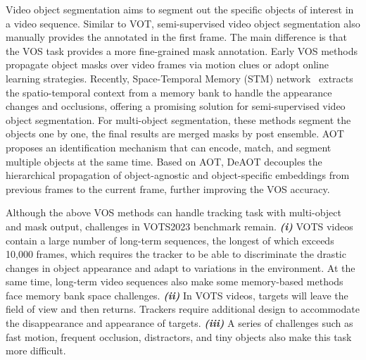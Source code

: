 \documentclass[10pt,twocolumn,letterpaper]{article}
\begin{document}
Video object segmentation aims to segment out the specific objects of interest in a video sequence. Similar to VOT, semi-supervised video object segmentation also manually provides the annotated in the first frame. The main difference is that the VOS task provides a more fine-grained mask annotation. 
Early VOS methods propagate object masks over video frames via motion clues\cite{segflow,tsai2016video} or adopt online learning strategies\cite{caelles2017one,li2018video}.
Recently, Space-Temporal Memory (STM) network~\cite{oh2019video, wang2017learning} extracts the spatio-temporal context from a memory bank to handle the appearance changes and occlusions, offering a promising solution for semi-supervised video object segmentation.
For multi-object segmentation, these methods segment the objects one by one, the final results are merged masks by post ensemble.
AOT\cite{aot} proposes an identification mechanism that can encode, match, and segment multiple objects at the same time. Based on AOT\cite{aot}, DeAOT\cite{deaot} decouples the hierarchical propagation of object-agnostic and object-specific embeddings from previous frames to the current frame, further improving the VOS accuracy.

Although the above VOS methods can handle tracking task with multi-object and mask output, 
challenges in VOTS2023 benchmark remain. 
\textbf{\textit{(i)}} VOTS videos contain a large number of long-term sequences, the longest of which exceeds 10,000 frames, which requires the tracker to be able to discriminate the drastic changes in object appearance and adapt to variations in the environment.
At the same time, long-term video sequences also make some memory-based methods face memory bank space challenges.
\textbf{\textit{(ii)}} In VOTS videos, targets will leave the field of view and then returns.
Trackers require additional design to accommodate the disappearance and appearance of targets. 
\textbf{\textit{(iii)}} A series of challenges such as fast motion, frequent occlusion, distractors, and tiny objects also make this task more difficult. 
\end{document}

